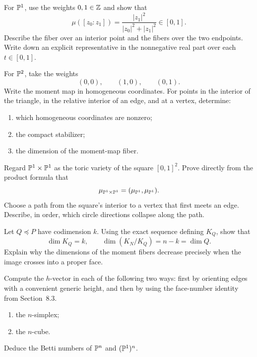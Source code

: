 \begin{exercises}

\item For \(\mathbb{P}^1\), use the weights \(0,1\in\mathbb{Z}\) and show that
\[
\mu([z_0:z_1])
=
\frac{|z_1|^2}{|z_0|^2+|z_1|^2}
\in[0,1].
\]
Describe the fiber over an interior point and the fibers over the two
endpoints. Write down an explicit representative in the nonnegative
real part over each \(t\in[0,1]\).

\item For \(\mathbb{P}^2\), take the weights
\[
(0,0),\qquad(1,0),\qquad(0,1).
\]
Write the moment map in homogeneous coordinates. For points in the
interior of the triangle, in the relative interior of an edge, and at
a vertex, determine:
\begin{enumerate}[label=(\alph*),wide=0pt]
\item which homogeneous coordinates are nonzero;
\item the compact stabilizer;
\item the dimension of the moment-map fiber.
\end{enumerate}

\item Regard \(\mathbb{P}^1\times\mathbb{P}^1\) as the toric variety of the square
\([0,1]^2\). Prove directly from the product formula that
\[
\mu_{\mathbb{P}^1\times\mathbb{P}^1}
=
(\mu_{\mathbb{P}^1},\mu_{\mathbb{P}^1}).
\]
Choose a path from the square's interior to a vertex that first meets
an edge. Describe, in order, which circle directions collapse along
the path.

\item Let \(Q\preceq P\) have codimension \(k\). Using the exact
sequence defining \(K_Q\), show that
\[
\dim K_Q=k,
\qquad
\dim(K_N/K_Q)=n-k=\dim Q.
\]
Explain why the dimensions of the moment fibers decrease precisely
when the image crosses into a proper face.

\item Compute the \(h\)-vector in each of the following two ways:
first by orienting edges with a convenient generic height, and then by
using the face-number identity from Section~8.3.
\begin{enumerate}[label=(\alph*),wide=0pt]
\item the \(n\)-simplex;
\item the \(n\)-cube.
\end{enumerate}
Deduce the Betti numbers of \(\mathbb{P}^n\) and \((\mathbb{P}^1)^n\).


\end{exercises}
